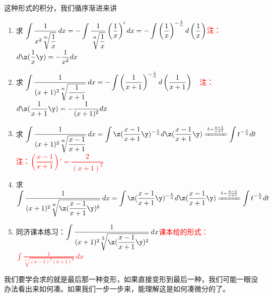 \begin{lemma}
这种形式的积分，我们循序渐进来讲
\begin{enumerate}
    \item 求 $\displaystyle \int \dfrac{1}{x^2\sqrt[{\raisebox{0.5ex}{$\scriptstyle n$}}]{\dfrac{1}{x}}}  \, dx = -\int \dfrac{1}{\sqrt[{\raisebox{0.5ex}{$\scriptstyle n$}}]{\dfrac{1}{x}}} \left( \dfrac{1}{x} \right)' dx = -\int \left( \dfrac{1}{x} \right)^{-\frac{1}{n}} d\left( \dfrac{1}{x} \right)$\quad \textcolor{red}{注：$ \displaystyle d\z( \frac{1}{x} \y)= -\frac{1}{x^2} dx $}

    \item 求 $\displaystyle \int \frac{1}{(x+1)^2 \sqrt[{\raisebox{0.5ex}{$\scriptstyle n$}}]{\dfrac{1}{x+1}}} \, dx = -\int \left( \dfrac{1}{x+1} \right)^{-\frac{1}{n}} d\left( \dfrac{1}{x+1} \right)\quad $\textcolor{red}{注：$ \displaystyle d\z( \frac{1}{x+1} \y) = -\frac{1}{(x+1)^2}dx $}

    \item 求 $\displaystyle \int \frac{1}{(x+1)^2 \sqrt[{\raisebox{0.5ex}{$\scriptstyle n$}}]{\dfrac{x-1}{x+1}}} \, dx 
    = \int \z( \frac{x-1}{x+1} \y)^{-\frac{1}{n}} d\z( \frac{x-1}{x+1} \y) \xlongequal{t=\frac{x-1}{x+1}} \int t^{-\frac{1}{n}} dt$
    \quad \textcolor{red}{注：$\displaystyle \left( \dfrac{x-1}{x+1} \right)' = \dfrac{2}{(x+1)^2}$}

    \item 求 $\displaystyle \int \frac{1}{(x+1)^2 \sqrt[{\raisebox{0.5ex}{$\scriptstyle n$}}]{\z(\dfrac{x-1}{x+1}\y)^k}} \, dx 
    = \int \z( \frac{x-1}{x+1} \y)^{-\frac{k}{n}} d\z( \frac{x-1}{x+1} \y) \xlongequal{t=\frac{x-1}{x+1}} \int t^{-\frac{k}{n}} dt$

    \item 同济课本练习：$\displaystyle \int \frac{1}{(x+1)^2 \sqrt[{\raisebox{0.5ex}{$\scriptstyle 3$}}]{\z(\dfrac{x-1}{x+1}\y)^2}} \, dx$\quad \textcolor{red}{课本给的形式：$\displaystyle \int \frac{1}{\sqrt[3]{(x-1)^2 (x+1)^4}} \, dx$}

\end{enumerate}

\vspace{1mm}
我们要学会求的就是最后那一种变形，如果直接变形到最后一种，我们可能一眼没办法看出来如何凑。如果我们一步一步来，能理解这是如何凑微分的了。
\end{lemma}

